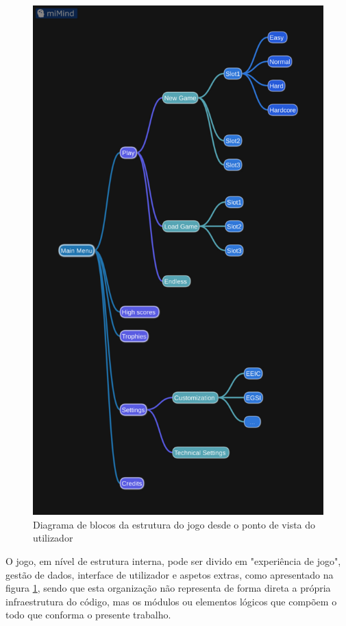 \documentclass[a4paper,11pt]{article}
\begin{document}
\begin{figure}[H]
    \centering
    \includegraphics[scale = 0.20]{2 - Esquemas/GameStructure.pdf}
    \caption{Diagrama de blocos da estrutura do jogo desde o ponto de vista do utilizador}
    \label{fig:GameModulesDiagram}
\end{figure}

O jogo, em nível de estrutura interna, pode ser divido em "experiência de jogo", gestão de dados, interface de utilizador e aspetos extras, como apresentado na figura \ref{fig:GameModulesDiagram}, sendo que esta organização não representa de forma direta a própria infraestrutura do código, mas os módulos ou elementos lógicos que compõem o todo que conforma o presente trabalho.
\end{document}
